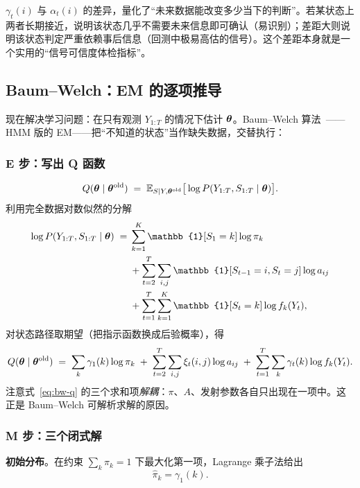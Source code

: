 \begin{remark}
$\gamma_t(i)$ 与 $\alpha_t(i)$ 的差异，量化了“未来数据能改变多少当下的判断”。若某状态上两者长期接近，说明该状态几乎不需要未来信息即可确认（易识别）；差距大则说明该状态判定严重依赖事后信息（回测中极易高估的信号）。这个差距本身就是一个实用的“信号可信度体检指标”。
\end{remark}

\subsection{Baum--Welch：EM 的逐项推导}

现在解决学习问题：在只有观测 $Y_{1:T}$ 的情况下估计 $\bm{\theta}$。Baum--Welch 算法~\cite{baum1970}——HMM 版的 EM——把“不知道的状态”当作缺失数据，交替执行：

\subsubsection{E 步：写出 Q 函数}

\begin{equation}
Q(\bm{\theta} \mid \bm{\theta}^{\text{old}}) \;=\; \mathbb{E}_{S \mid Y, \bm{\theta}^{\text{old}}}\big[\log P(Y_{1:T}, S_{1:T} \mid \bm{\theta})\big].
\end{equation}
利用完全数据对数似然的分解
\begin{align}
\log P(Y_{1:T}, S_{1:T} \mid \btheta) \;=\;& \sum_{k=1}^{K} \mathbb{1}[S_1=k]\log \pi_k \notag\\
&+ \sum_{t=2}^{T}\sum_{i,j} \mathbb{1}[S_{t-1}=i, S_t=j]\log a_{ij} \notag\\
&+ \sum_{t=1}^{T}\sum_{k=1}^{K} \mathbb{1}[S_t=k]\log f_k(Y_t),
\end{align}
对状态路径取期望（把指示函数换成后验概率），得
\begin{equation}
Q(\bm{\theta} \mid \bm{\theta}^{\text{old}}) \;=\;
\sum_{k} \gamma_1(k) \log \pi_k
\;+\; \sum_{t=2}^{T}\sum_{i,j} \xi_t(i,j) \log a_{ij}
\;+\; \sum_{t=1}^{T}\sum_{k} \gamma_t(k) \log f_k(Y_t).
\label{eq:bw-q}
\end{equation}
注意式~\eqref{eq:bw-q} 的三个求和项\emph{解耦}：$\pi$、$A$、发射参数各自只出现在一项中。这正是 Baum--Welch 可解析求解的原因。

\subsubsection{M 步：三个闭式解}

\textbf{初始分布}。在约束 $\sum_k \pi_k = 1$ 下最大化第一项，Lagrange 乘子法给出
\begin{equation}
\hat{\pi}_k = \gamma_1(k).
\end{equation}

